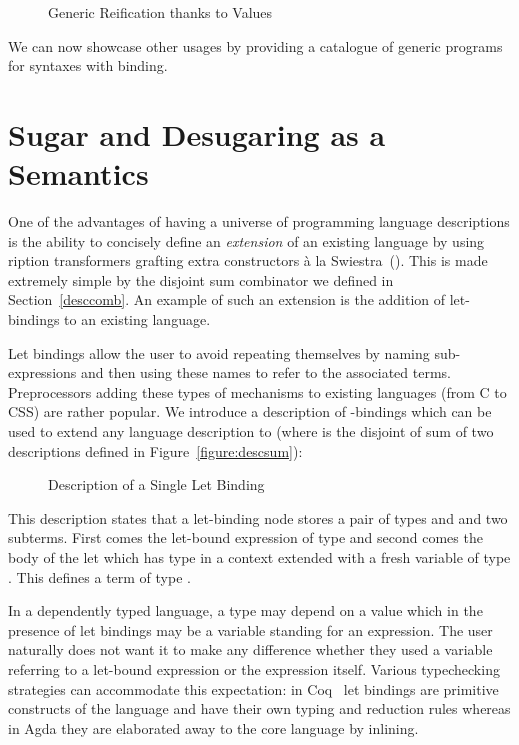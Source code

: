 \begin{figure}[h]
\caption{Generic Reification thanks to  Values\label{fig:kripkereify}}
\end{figure}

We can now showcase other usages by providing a catalogue of generic programs
for syntaxes with binding.

\section{Sugar and Desugaring as a Semantics}\label{section:letbinding}

One of the advantages of having a universe of programming language
descriptions is the ability to concisely define an \emph{extension}
of an existing language by using ription transformers
grafting extra constructors à la Swiestra~(\citeyear{swierstra_2008}).
This is made extremely simple by the
disjoint sum combinator  we defined in Section~\ref{desccomb}.
An example of such an extension is the addition of let-bindings to
an existing language.

Let bindings allow the user to avoid repeating themselves by naming
sub-expressions and then using these names to refer to the associated
terms. Preprocessors adding these types of mechanisms to existing
languages (from C to CSS) are rather popular. We introduce a
description of -bindings which can be used to extend any
language description  to    (where 
is the disjoint of sum of two descriptions defined in Figure~\ref{figure:descsum}):

\begin{figure}[h]
\caption{Description of a Single Let Binding}
\end{figure}

This description states that a let-binding node stores a pair of types
\AB{$\sigma$} and \AB{$\tau$} and two subterms. First comes the let-bound
expression of type \AB{$\sigma$} and second comes the body of the let which
has type \AB{$\tau$} in a context extended with a fresh variable of type
\AB{$\sigma$}. This defines a term of type \AB{$\tau$}.

In a dependently typed language, a type may depend on a value which
in the presence of let bindings may be a variable standing for an
expression. The user naturally does not want it to make any difference
whether they used a variable referring to a let-bound expression or
the expression itself. Various typechecking strategies can accommodate
this expectation: in Coq~\cite{Coq:manual} let bindings are primitive
constructs of the language and have their own typing and reduction
rules whereas in Agda they are elaborated away to the core language
by inlining.

